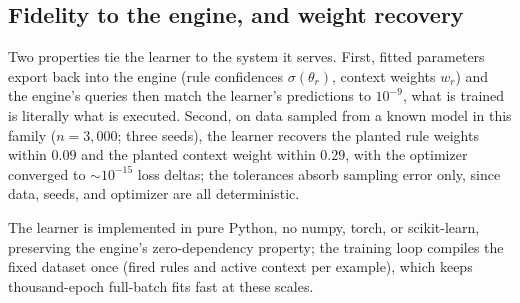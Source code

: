 \subsection{Fidelity to the engine, and weight recovery}

Two properties tie the learner to the system it serves. First, fitted
parameters export back into the engine (rule confidences
$\sigma(\theta_r)$, context weights $w_r$) and the engine's queries then
match the learner's predictions to $10^{-9}$, what is trained is
literally what is executed. Second, on data sampled from a known model
in this family ($n=3{,}000$; three seeds), the learner recovers the
planted rule weights within $0.09$ and the planted context weight within
$0.29$, with the optimizer converged to $\sim 10^{-15}$ loss deltas; the
tolerances absorb sampling error only, since data, seeds, and optimizer
are all deterministic.

The learner is implemented in pure Python, no numpy, torch, or
scikit-learn, preserving the engine's zero-dependency property; the
training loop compiles the fixed dataset once (fired rules and active
context per example), which keeps thousand-epoch full-batch fits fast at
these scales.
